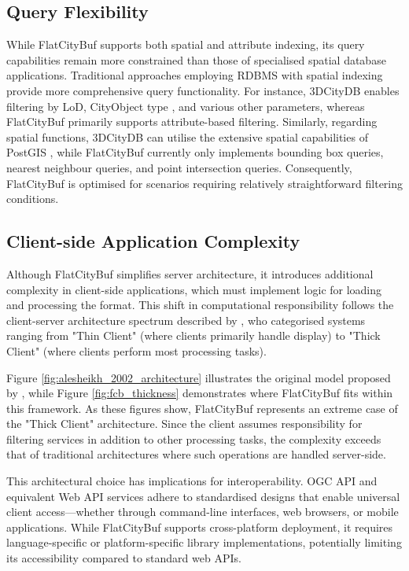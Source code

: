 \subsection{Query Flexibility}
\label{flexibility_of_query}

While FlatCityBuf supports both spatial and attribute indexing, its query capabilities remain more constrained than those of specialised spatial database applications. Traditional approaches employing RDBMS with spatial indexing provide more comprehensive query functionality. For instance, 3DCityDB enables filtering by LoD, CityObject type \citep{3dcitydb}, and various other parameters, whereas FlatCityBuf primarily supports attribute-based filtering. Similarly, regarding spatial functions, 3DCityDB can utilise the extensive spatial capabilities of PostGIS \citep{postgis}, while FlatCityBuf currently only implements bounding box queries, nearest neighbour queries, and point intersection queries. Consequently, FlatCityBuf is optimised for scenarios requiring relatively straightforward filtering conditions.
\subsection{Client-side Application Complexity}
\label{complexity_of_client_side_application}

Although FlatCityBuf simplifies server architecture, it introduces additional complexity in client-side applications, which must implement logic for loading and processing the format. This shift in computational responsibility follows the client-server architecture spectrum described by \citet{alesheikh_2002}, who categorised systems ranging from "Thin Client" (where clients primarily handle display) to "Thick Client" (where clients perform most processing tasks).

Figure \ref{fig:alesheikh_2002_architecture} illustrates the original model proposed by \citet{alesheikh_2002}, while Figure \ref{fig:fcb_thickness} demonstrates where FlatCityBuf fits within this framework. As these figures show, FlatCityBuf represents an extreme case of the "Thick Client" architecture. Since the client assumes responsibility for filtering services in addition to other processing tasks, the complexity exceeds that of traditional architectures where such operations are handled server-side.

This architectural choice has implications for interoperability. OGC API \citep{ogc_api} and equivalent Web API services adhere to standardised designs that enable universal client access—whether through command-line interfaces, web browsers, or mobile applications. While FlatCityBuf supports cross-platform deployment, it requires language-specific or platform-specific library implementations, potentially limiting its accessibility compared to standard web APIs.

